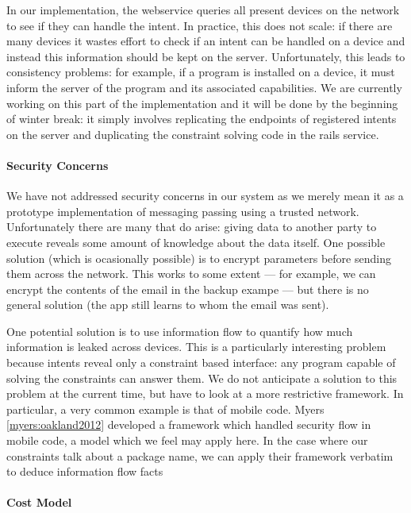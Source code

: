\documentclass{acm_proc_article-sp}
\begin{document}
In our implementation, the webservice queries all present devices on
the network to see if they can handle the intent.  In practice, this
does not scale: if there are many devices it wastes effort to check if
an intent can be handled on a device and instead this information
should be kept on the server.  Unfortunately, this leads to
consistency problems: for example, if a program is installed on a
device, it must inform the server of the program and its associated
capabilities.  We are currently working on this part of the
implementation and it will be done by the beginning of winter break:
it simply involves replicating the endpoints of registered intents on
the server and duplicating the constraint solving code in the rails
service.

\paragraph{Security Concerns}

We have not addressed security concerns in our system as we merely
mean it as a prototype implementation of messaging passing using a
trusted network.  Unfortunately there are many that do arise: giving
data to another party to execute reveals some amount of knowledge
about the data itself.  One possible solution (which is ocasionally
possible) is to encrypt parameters before sending them across the
network.  This works to some extent --- for example, we can encrypt
the contents of the email in the backup exampe --- but there is no
general solution (the app still learns to whom the email was sent).

One potential solution is to use information flow to quantify how much
information is leaked across devices.  This is a particularly
interesting problem because intents reveal only a constraint based
interface: any program capable of solving the constraints can answer
them.  We do not anticipate a solution to this problem at the current
time, but have to look at a more restrictive framework.  In
particular, a very common example is that of mobile code.  Myers
\ref{myers:oakland2012} developed a framework which handled security
flow in mobile code, a model which we feel may apply here.  In the
case where our constraints talk about a package name, we can apply
their framework verbatim to deduce information flow facts

\paragraph{Cost Model}
\end{document}
